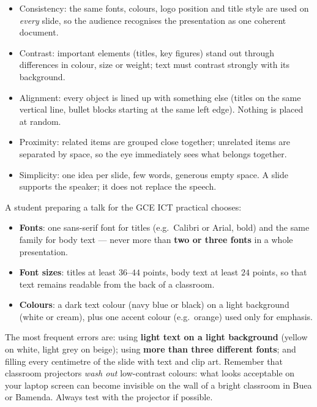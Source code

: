\documentclass[11pt]{article}
\newcommand{\cle}[1]{{\popxbold\color{popdark}#1}}
\begin{document}
\begin{definition}
\begin{itemize}
\item \cle{Consistency}: the same fonts, colours, logo position and title style are used on \emph{every} slide, so the audience recognises the presentation as one coherent document.
\item \cle{Contrast}: important elements (titles, key figures) stand out through differences in colour, size or weight; text must contrast strongly with its background.
\item \cle{Alignment}: every object is lined up with something else (titles on the same vertical line, bullet blocks starting at the same left edge). Nothing is placed at random.
\item \cle{Proximity}: related items are grouped close together; unrelated items are separated by space, so the eye immediately sees what belongs together.
\item \cle{Simplicity}: one idea per slide, few words, generous empty space. A slide supports the speaker; it does not replace the speech.
\end{itemize}
\end{definition}

\begin{exemplebox}
A student preparing a talk for the GCE ICT practical chooses:
\begin{itemize}
\item \textbf{Fonts}: one sans-serif font for titles (e.g.\ Calibri or Arial, bold) and the same family for body text --- never more than \textbf{two or three fonts} in a whole presentation.
\item \textbf{Font sizes}: titles at least $36$--$44$ points, body text at least $24$ points, so that text remains readable from the back of a classroom.
\item \textbf{Colours}: a dark text colour (navy blue or black) on a light background (white or cream), plus one accent colour (e.g.\ orange) used only for emphasis.
\end{itemize}
\end{exemplebox}

\begin{attention}
The most frequent errors are: using \textbf{light text on a light background} (yellow on white, light grey on beige); using \textbf{more than three different fonts}; and filling every centimetre of the slide with text and clip art. Remember that classroom projectors \emph{wash out} low-contrast colours: what looks acceptable on your laptop screen can become invisible on the wall of a bright classroom in Buea or Bamenda. Always test with the projector if possible.
\end{attention}
\end{document}
